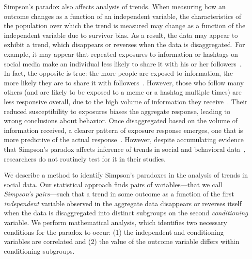 Simpson's paradox also affects analysis of trends. When measuring how an outcome changes as a function of an independent variable, the characteristics of the population over which the trend is measured may change as a function of the independent variable due to survivor bias. As a result, the data may appear to exhibit a trend, which disappears or reverses when the data is disaggregated. %
For example, it may appear that repeated exposures to information or hashtags on social media make an individual less likely to share it with his or her followers~\cite{Romero11www}. In fact, the opposite is true: the more people are exposed to information, the more likely they are to share it with followers~\cite{Lerman2016futureinternet}. However, those who follow many others (and are likely to be exposed to a meme or a hashtag multiple times) are less responsive overall, due to the high volume of information they receive~\cite{Hodas12socialcom}. Their reduced susceptibility to exposures biases the aggregate response, leading to wrong conclusions about behavior. Once disaggregated based on the volume of information received, a clearer pattern of exposure response emerges, one that is more predictive of the actual response~\cite{Hodas14srep}.
However, despite accumulating evidence that Simpson's paradox %
affects inference of trends in social and behavioral data~\cite{Singer2016plosone,Barbosa2016,KootiA2017www,Agarwal2017quitting}, researchers do not routinely test for it in their studies.

We describe a method to identify Simpson's paradoxes in the analysis of trends in social data. %
Our statistical approach finds pairs of variables---that we call \emph{Simpson's pairs}---such that a trend in some outcome as a function of the first \emph{independent} variable observed in the aggregate data  disappears or reverses itself when the data is disaggregated into distinct subgroups on the second \emph{conditioning} variable.
We perform mathematical analysis, which identifies two necessary conditions for the paradox to occur: (1) the independent and conditioning variables are correlated and (2) the value of the outcome variable differs within conditioning subgroups.
%

